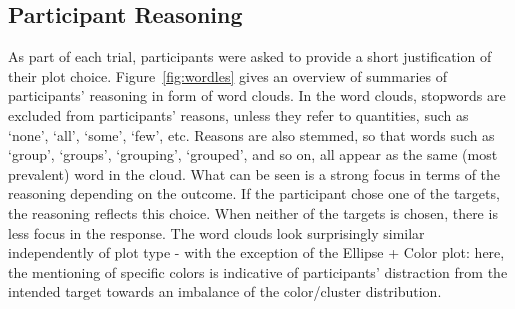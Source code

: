 \documentclass[12pt]{article}\usepackage[]{graphicx}\usepackage[]{color}
\begin{document}
\subsection{Participant Reasoning}\label{sec:sentiment}
As part of each trial, participants were asked to provide a short justification of their plot choice. Figure~\ref{fig:wordles} gives an overview of summaries of participants' reasoning in form of word clouds. In the word clouds, stopwords are excluded from participants' reasons, unless they refer to quantities, such as `none', `all', `some', `few', etc. Reasons are also stemmed, so that words such as `group', `groups', `grouping', `grouped', and so on, all appear as the same (most prevalent) word in the cloud. What can be seen is a strong focus in terms of the reasoning depending on the outcome. If the participant chose one of the targets, the reasoning reflects this choice. When neither of the targets is chosen, there is less focus in the response. The word clouds look surprisingly similar independently of plot type - with the exception of the Ellipse + Color plot: here, the mentioning of specific colors is indicative of participants' distraction from the intended target towards an imbalance of the color/cluster distribution. 
\end{document}
